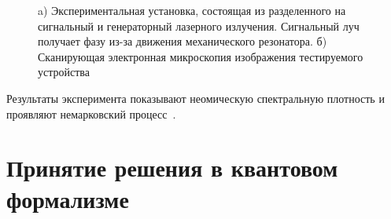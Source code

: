 \begin{figure}[h!]
\begin{minipage}[h]{0.5\linewidth}
    \end{minipage}
    \caption{a) Экспериментальная установка, состоящая из разделенного на сигнальный и генераторный
    лазерного излучения. Сигнальный луч получает фазу из-за движения механического резонатора.
    б) Сканирующая электронная микроскопия изображения тестируемого устройства~\citep{nonmark2017dynamics}}
    \label{fig:nonmark_brown}
\end{figure}

Результаты эксперимента показывают неомическую спектральную плотность и проявляют немарковский процесс~\citep{nonmark2017dynamics}.

\section{Принятие решения в квантовом формализме}

